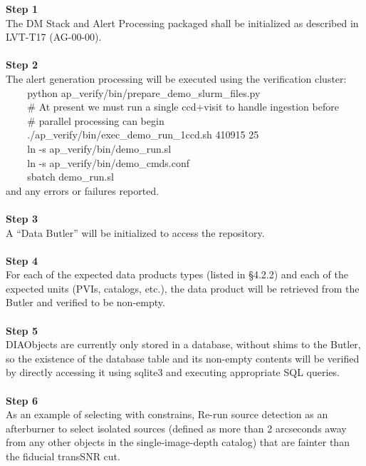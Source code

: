 \textbf{Step 1}\\
The DM Stack and Alert Processing packaged shall be initialized as
described in LVT-T17 (AG-00-00).\\
~\\
\textbf{Step 2}\\
The alert generation processing will be executed using the verification
cluster:\\
\hspace*{0.333em} ~ ~ ~python
ap\_verify/bin/prepare\_demo\_slurm\_files.py\\
\hspace*{0.333em} ~ ~ ~\# At present we must run a single ccd+visit to
handle ingestion before\\
\hspace*{0.333em} ~ ~ ~\# parallel processing can begin\\
\hspace*{0.333em} ~ ~ ~./ap\_verify/bin/exec\_demo\_run\_1ccd.sh 410915
25\\
\hspace*{0.333em} ~ ~ ~ln -s ap\_verify/bin/demo\_run.sl\\
\hspace*{0.333em} ~ ~ ~ln -s ap\_verify/bin/demo\_cmds.conf\\
\hspace*{0.333em} ~ ~ ~sbatch demo\_run.sl\\
and any errors or failures reported.\\
~\\
\textbf{Step 3}\\
A ``Data Butler'' will be initialized to access the repository.\\
~\\
\textbf{Step 4}\\
For each of the expected data products types (listed in §4.2.2) and each
of the expected units (PVIs, catalogs, etc.), the data product will be
retrieved from the Butler and verified to be non-empty.\\
~\\
\textbf{Step 5}\\
DIAObjects are currently only stored in a database, without shims to the
Butler, so the existence of the database table and its non-empty
contents will be verified by directly accessing it using sqlite3 and
executing appropriate SQL queries.\\
~\\
\textbf{Step 6}\\
As an example of selecting with constrains, Re-run source detection as
an afterburner to select isolated sources (defined as more than 2
arcseconds away from any other objects in the single-image-depth
catalog) that are fainter than the fiducial transSNR cut.\\
~\\

